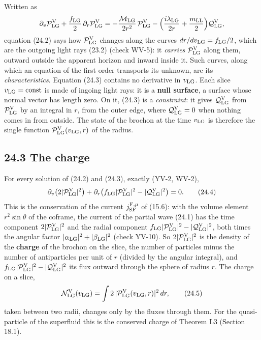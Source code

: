 \documentclass[
  10pt,
]{article}
\begin{document}
Written as
\[\partial_v\mathcal P^{\rm V}_{\rm LG}+\frac{f_{\rm LG}}2\,\partial_r\mathcal P^{\rm V}_{\rm LG}=-\frac{\mathcal M_{\rm LG}}{2r^2}\,\mathcal P^{\rm V}_{\rm LG}-\Big(\frac{i\lambda_{\rm LG}}{2r}+\frac{m_{\rm LL}}2\Big)\mathcal Q^{\rm V}_{\rm LG},\]
equation (24.2) says how \(\mathcal P^{\rm V}_{\rm LG}\) changes along
the curves \(dr/dv_{\rm LG}=f_{\rm LG}/2\), which are the outgoing light
rays (23.2) (check WV-5): it \emph{carries}
\(\mathcal P^{\rm V}_{\rm LG}\) along them, outward outside the apparent
horizon and inward inside it. Such curves, along which an equation of
the first order transports its unknown, are its \emph{characteristics}.
Equation (24.3) contains no derivative in \(v_{\rm LG}\). Each slice
\(v_{\rm LG}=\text{const}\) is made of ingoing light rays: it is a
\textbf{null surface}, a surface whose normal vector has length zero. On
it, (24.3) is a \emph{constraint}: it gives
\(\mathcal Q^{\rm V}_{\rm LG}\) from \(\mathcal P^{\rm V}_{\rm LG}\) by
an integral in \(r\), from the outer edge, where
\(\mathcal Q^{\rm V}_{\rm LG}=0\) when nothing comes in from outside.
The state of the brochon at the time \(v_{\rm LG}\) is therefore the
single function \(\mathcal P^{\rm V}_{\rm LG}(v_{\rm LG},r)\) of the
radius.

\hypertarget{the-charge}{%
\subsection{24.3 The charge}\label{the-charge}}

For every solution of (24.2) and (24.3), exactly (YV-2, WV-2),
\[\partial_v\big(2\lvert\mathcal P^{\rm V}_{\rm LG}\rvert^2\big)+\partial_r\big(f_{\rm LG}\lvert\mathcal P^{\rm V}_{\rm LG}\rvert^2-\lvert\mathcal Q^{\rm V}_{\rm LG}\rvert^2\big)=0.\tag{24.4}\]
This is the conservation of the current \(j^{{\rm F},\mu}_{\rm SF}\) of
(15.6): with the volume element \(r^2\sin\theta\) of the coframe, the
current of the partial wave (24.1) has the time component
\(2\lvert\mathcal P^{\rm V}_{\rm LG}\rvert^2\) and the radial component
\(f_{\rm LG}\lvert\mathcal P^{\rm V}_{\rm LG}\rvert^2-\lvert\mathcal Q^{\rm V}_{\rm LG}\rvert^2\),
both times the angular factor
\(\lvert\alpha_{\rm LG}\rvert^2+\lvert\beta_{\rm LG}\rvert^2\) (check
YV-10). So \(2\lvert\mathcal P^{\rm V}_{\rm LG}\rvert^2\) is the density
of the \textbf{charge} of the brochon on the slice, the number of
particles minus the number of antiparticles per unit of \(r\) (divided
by the angular integral), and
\(f_{\rm LG}\lvert\mathcal P^{\rm V}_{\rm LG}\rvert^2-\lvert\mathcal Q^{\rm V}_{\rm LG}\rvert^2\)
its flux outward through the sphere of radius \(r\). The charge on a
slice,
\[\mathcal N^{\rm V}_{\rm LG}(v_{\rm LG})=\int2\,\lvert\mathcal P^{\rm V}_{\rm LG}(v_{\rm LG},r)\rvert^2\,dr,\tag{24.5}\]
taken between two radii, changes only by the fluxes through them. For
the quasi-particle of the superfluid this is the conserved charge of
Theorem L3 (Section 18.1).
\end{document}
